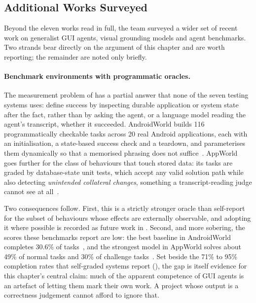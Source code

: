 \subsection{Additional Works Surveyed}
\label{subsec:additional}

Beyond the eleven works read in full, the team surveyed a wider set of recent
work on generalist GUI agents, visual grounding models and agent benchmarks.
Two strands bear directly on the argument of this chapter and are worth
reporting; the remainder are noted only briefly.

\paragraph{Benchmark environments with programmatic oracles.} The measurement
problem of  has a partial answer that none of the
seven testing systems uses: define success by inspecting durable application or
system state after the fact, rather than by asking the agent, or a language
model reading the agent's transcript, whether it succeeded. AndroidWorld builds
116 programmatically checkable tasks across 20 real Android applications, each
with an initialisation, a state-based success check and a teardown, and
parameterises them dynamically so that a memorised phrasing does not
suffice~\cite{androidworld}. AppWorld goes further for the class of behaviours
that touch stored data: its tasks are graded by database-state unit tests,
which accept any valid solution path while also detecting \emph{unintended
collateral changes}, something a transcript-reading judge cannot see at
all~\cite{appworld}.

Two consequences follow. First, this is a strictly stronger oracle than
self-report for the subset of behaviours whose effects are externally
observable, and adopting it where possible is recorded as future work in
. Second, and more sobering, the scores these benchmarks
report are low: the best baseline in AndroidWorld completes 30.6\% of
tasks~\cite{androidworld}, and the strongest model in AppWorld solves about
49\% of normal tasks and 30\% of challenge tasks~\cite{appworld}. Set beside
the 71\% to 95\% completion rates that self-graded systems report
(), the gap is itself evidence for this chapter's central
claim: much of the apparent competence of GUI agents is an artefact of letting
them mark their own work. A project whose output is a correctness judgement
cannot afford to ignore that.

